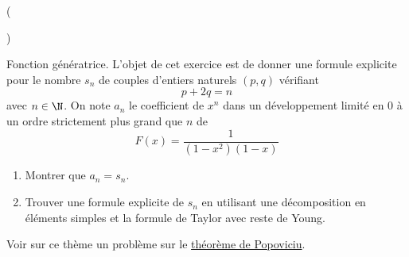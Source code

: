 \begin{tiny}()\end{tiny} Fonction génératrice. 
L'objet de cet exercice est de donner une formule explicite pour le nombre $s_n$ de couples d'entiers naturels $(p,q)$ vérifiant
\begin{displaymath}
 p+2q = n
\end{displaymath}
avec $n\in \N$. On note $a_n$ le coefficient de $x^n$ dans un développement limité en $0$ à un ordre strictement plus grand que $n$ de 
\begin{displaymath}
 F(x) = \frac{1}{(1-x^2)(1-x)}
\end{displaymath}
\begin{enumerate}
 \item Montrer que $a_n=s_n$.
\item Trouver une formule explicite de $s_n$ en utilisant une décomposition en éléments simples et la formule de Taylor avec reste de Young.
\end{enumerate}
Voir sur ce thème un problème sur le \href{\baseurl devoirs\_nicolair/Apopovi.pdf}{théorème de Popoviciu}.